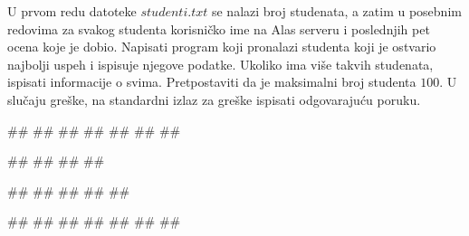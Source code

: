 \begin{Exercise}[label=p3_06] 
 U prvom redu datoteke $studenti.txt$ se nalazi broj studenata, 
 a zatim u posebnim redovima za svakog studenta korisničko ime na Alas serveru i poslednjih pet ocena koje je dobio. 
 Napisati program koji pronalazi studenta koji je ostvario najbolji 
 uspeh i ispisuje njegove podatke. Ukoliko ima više takvih studenata, ispisati informacije o svima.
 Pretpostaviti da je maksimalni broj studenta $100$.
 U slučaju greške, na standardni izlaz za greške ispisati odgovarajuću poruku.

\begin{miditest}
\begin{upotreba}{1}
##
##
##
##
##
##
##

#\naslovIzlaz#
##
##
##
\end{upotreba}
\end{miditest}
\begin{miditest}
\begin{upotreba}{2}
##
##
##
##
##

#\naslovIzlaz#
##
##
##
#\izlaz{}#
##
##
\end{upotreba}
\end{miditest}
\end{Exercise}
\begin{Answer}[ref=p3_06]
\end{Answer}



